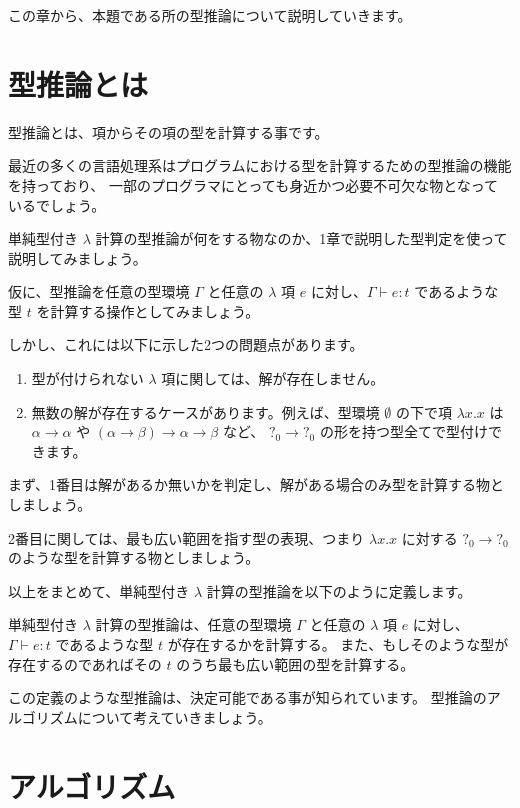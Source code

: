 
この章から、本題である所の型推論について説明していきます。

\section{型推論とは}

型推論とは、項からその項の型を計算する事です。

最近の多くの言語処理系はプログラムにおける型を計算するための型推論の機能を持っており、
一部のプログラマにとっても身近かつ必要不可欠な物となっているでしょう。

単純型付き $\lambda$ 計算の型推論が何をする物なのか、1章で説明した型判定を使って説明してみましょう。

仮に、型推論を任意の型環境 $\Gamma$ と任意の $\lambda$ 項 $e$ に対し、$\Gamma \vdash e : t$
であるような型 $t$ を計算する操作としてみましょう。

しかし、これには以下に示した2つの問題点があります。

\begin{enumerate}
  \item 型が付けられない $\lambda$ 項に関しては、解が存在しません。
  \item 無数の解が存在するケースがあります。例えば、型環境 $\emptyset$ の下で項 $\lambda x . x$ は
		$\alpha \to \alpha$ や $(\alpha \to \beta) \to \alpha \to \beta$ など、
		$?_0 \to ?_0$ の形を持つ型全てで型付けできます。
\end{enumerate}

まず、1番目は解があるか無いかを判定し、解がある場合のみ型を計算する物としましょう。

2番目に関しては、最も広い範囲を指す型の表現、つまり $\lambda x . x$ に対する $?_0 \to ?_0$
のような型を計算する物としましょう。

以上をまとめて、単純型付き $\lambda$ 計算の型推論を以下のように定義します。

\begin{definition}
単純型付き $\lambda$ 計算の型推論は、任意の型環境 $\Gamma$ と任意の $\lambda$ 項 $e$ に対し、
$\Gamma \vdash e : t$ であるような型 $t$ が存在するかを計算する。
また、もしそのような型が存在するのであればその $t$ のうち最も広い範囲の型を計算する。
\end{definition}

この定義のような型推論は、決定可能である事が知られています。
型推論のアルゴリズムについて考えていきましょう。

\section{アルゴリズム}

